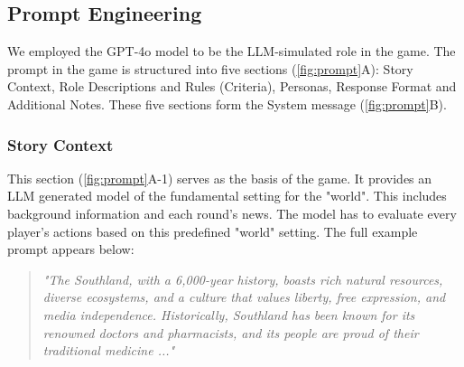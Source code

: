 \subsection{Prompt Engineering }
\label{Prompt Engineering}

We employed the GPT-4o model to be the LLM-simulated role in the game. The prompt in the game is structured into five sections (\autoref{fig:prompt}A): Story Context, Role Descriptions and Rules (Criteria), Personas, Response Format and Additional Notes. These five sections form the System message (\autoref{fig:prompt}B).
\subsubsection{Story Context}
This section (\autoref{fig:prompt}A-1) serves as the basis of the game. It provides an LLM generated model of the fundamental setting for the "world". This includes background information and each round’s news. The model has to evaluate every player's actions based on this predefined "world" setting. The full example prompt appears below:
\begin{quote}
    \textit{"The Southland, with a 6,000-year history, boasts rich natural resources, diverse ecosystems, and a culture that values liberty, free expression, and media independence. Historically, Southland has been known for its renowned doctors and pharmacists, and its people are proud of their traditional medicine ..."}
\end{quote}


